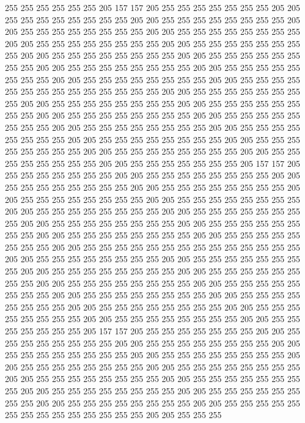 255 255 255 255 255 255 205 157 157 205 255 255 255 255 255 255 255 205 205 255
255 255 255 255 255 255 255 205 205 255 255 255 255 255 255 255 255 205 205 255
255 255 255 255 255 255 255 205 205 255 255 255 255 255 255 255 255 205 205 255
255 255 255 255 255 255 255 205 205 255 255 255 255 255 255 255 255 205 205 255
255 255 255 255 255 255 255 205 205 255 255 255 255 255 255 255 255 205 205 255
255 255 255 255 255 255 255 205 205 255 255 255 255 255 255 255 255 205 205 255
255 255 255 255 255 255 255 205 205 255 255 255 255 255 255 255 255 255 255 255
255 255 255 205 205 255 255 255 255 255 255 255 255 205 205 255 255 255 255 255
255 255 255 205 205 255 255 255 255 255 255 255 255 205 205 255 255 255 255 255
255 255 255 205 205 255 255 255 255 255 255 255 255 205 205 255 255 255 255 255
255 255 255 205 205 255 255 255 255 255 255 255 255 205 205 255 255 255 255 255
255 255 255 205 205 255 255 255 255 255 255 255 255 205 205 255 255 255 255 255
255 255 255 205 205 255 255 255 255 255 255 255 255 205 205 255 255 255 255 255
255 255 205 157 157 205 255 255 255 255 255 255 255 205 205 255 255 255 255 255
255 255 255 205 205 255 255 255 255 255 255 255 255 205 205 255 255 255 255 255
255 255 255 205 205 255 255 255 255 255 255 255 255 205 205 255 255 255 255 255
255 255 255 205 205 255 255 255 255 255 255 255 255 205 205 255 255 255 255 255
255 255 255 205 205 255 255 255 255 255 255 255 255 205 205 255 255 255 255 255
255 255 255 205 205 255 255 255 255 255 255 255 255 205 205 255 255 255 255 255
255 255 255 205 205 255 255 255 255 255 255 255 255 255 255 255 255 255 255 205
205 255 255 255 255 255 255 255 255 205 205 255 255 255 255 255 255 255 255 205
205 255 255 255 255 255 255 255 255 205 205 255 255 255 255 255 255 255 255 205
205 255 255 255 255 255 255 255 255 205 205 255 255 255 255 255 255 255 255 205
205 255 255 255 255 255 255 255 255 205 205 255 255 255 255 255 255 255 255 205
205 255 255 255 255 255 255 255 255 205 205 255 255 255 255 255 255 255 255 205
205 255 255 255 255 255 255 255 255 205 205 255 255 255 255 255 255 255 205 157
157 205 255 255 255 255 255 255 255 205 205 255 255 255 255 255 255 255 255 205
205 255 255 255 255 255 255 255 255 205 205 255 255 255 255 255 255 255 255 205
205 255 255 255 255 255 255 255 255 205 205 255 255 255 255 255 255 255 255 205
205 255 255 255 255 255 255 255 255 205 205 255 255 255 255 255 255 255 255 205
205 255 255 255 255 255 255 255 255 205 205 255 255 255 255 255 255 255 255 205
205 255 255 255 255 255 255 255 255 205 205 255 255 255 255 255 255 255 255 205
205 255 255 255 255 255 255 255 255 255 255 255 255 255 255 205 205 255 255 255
